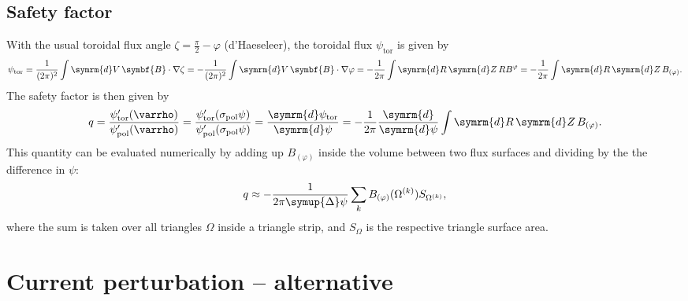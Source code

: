 \documentclass[a4paper, 10pt, english]{article}
\let\temp\varrho
\let\varrho\rho
\let\rho\temp
\let\temp\vartheta
\let\vartheta\theta
\let\theta\temp
\let\temp\varphi
\let\varphi\phi
\let\phi\temp
\let\vec\symbf
\newcommand*\diff{\ensuremath{\symrm{d}}}  %
\newcommand*\td[2][]{\ensuremath{\frac{\diff #1}{\diff #2}}}  %
\newcommand*\pol{\ensuremath{\textrm{pol}}}  %
\newcommand*\tor{\ensuremath{\textrm{tor}}}  %
\begin{document}
\subsection{Safety factor}
\label{sec:safety_factor}

With the usual toroidal flux angle $\zeta = \frac{\pi}{2} - \phi$ (d'Haeseleer), the toroidal flux $\psi_{\tor}$ is given by
\begin{gather}
  \psi_{\tor} = \frac{1}{(2 \pi)^{2}} \int \diff V \, \vec{B} \cdot \nabla \zeta = -\frac{1}{(2 \pi)^{2}} \int \diff V \, \vec{B} \cdot \nabla \phi = -\frac{1}{2 \pi} \int \diff R \, \diff Z \, R B^{\phi} = -\frac{1}{2 \pi} \int \diff R \, \diff Z \, B_{(\phi)}.
\end{gather}
The safety factor is then given by
\begin{gather*}
  q = \frac{\psi_{\tor}' (\rho)}{\psi_{\pol}' (\rho)} = \frac{\psi_{\tor}' (\sigma_{\pol} \psi)}{\psi_{\pol}' (\sigma_{\pol} \psi)} = \td[\psi_{\tor}]{\psi} = -\frac{1}{2 \pi} \td{\psi} \int \diff R \, \diff Z \, B_{(\phi)}.
\end{gather*}
This quantity can be evaluated numerically by adding up $B_{(\phi)}$ inside the volume between two flux surfaces and dividing by the the difference in $\psi$:
\begin{gather}
  q \approx -\frac{1}{2 \pi \symup{\Delta} \psi} \sum_{k} B_{(\phi)} (\Omega^{(k)}) S_{\Omega^{(k)}},
\end{gather}
where the sum is taken over all triangles $\Omega$ inside a triangle strip, and $S_{\Omega}$ is the respective triangle surface area.

\appendix
\section{Current perturbation -- alternative}
\end{document}
